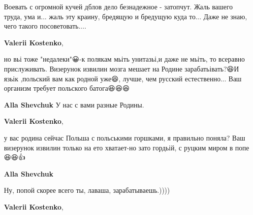\begin{itemize}
Воевать с огромной кучей дблов дело безнадежное - затопчут. Жаль вашего труда,
ума и... жаль эту краину, бредящую и бредущую куда то... Даже не знаю, чего
такого посоветовать....🤔🤔🙄

\begin{itemize}
 
\textbf{Valerii Kostenko}, 

но вьі тоже "недалеки"😀-к полякам мьіть унитазьі,и даже не мьіть, то всеравно
прислуживать. Визерунок извилин мозга мешает на Родине зарабатьівать?😆И язьік
,польский вам как родной уже😆, лучше, чем русский естественно... Ваш организм
требует польского батога😆😆😆


 
\textbf{Alla Shevchuk}
У нас с вами разные Родины.

 
\textbf{Valerii Kostenko},

у вас родина сейчас Польша с польськими горшками, я правильно поняла? Ваш
визерунок извилин только на ето хватает-но зато гордьій, с руцким миром в
попе😆😆👍


 
\textbf{Alla Shevchuk}

Ну, попой скорее всего ты, лаваша, зарабатываешь.))))

 
\textbf{Valerii Kostenko},


\end{itemize}
\end{itemize}
